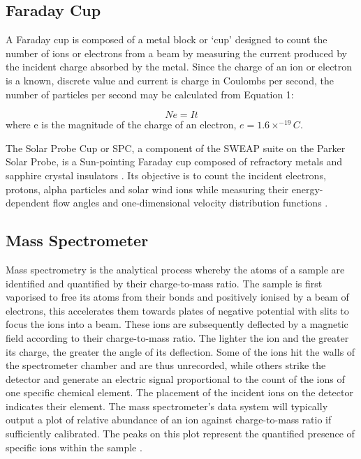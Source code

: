 \documentclass[12pt]{article}
\begin{document}
\vspace{\baselineskip}
\subsection{Faraday Cup}
\vspace{\baselineskip}

A Faraday cup is composed of a metal block or ‘cup’ designed to count the number of ions or electrons from a beam by measuring the current produced by the incident charge absorbed by the metal. Since the charge of an ion or electron is a known, discrete value and current is charge in Coulombs per second, the number of particles per second may be calculated from Equation 1:

\begin{equation} \label{particles}
    Ne = It
\end{equation}
\vspace{\baselineskip}
where e is the magnitude of the charge of an electron, $e = 1.6 × ^{−19} C$. 

The Solar Probe Cup or SPC, a component of the SWEAP suite on the Parker Solar Probe, is a Sun-pointing Faraday cup composed of refractory metals and sapphire crystal insulators \cite{faradaycup}. Its objective is to count the incident electrons, protons, alpha particles and solar wind ions while measuring their energy-dependent flow angles and one-dimensional velocity distribution functions \cite{pspcup}.

\vspace{\baselineskip}
\subsection{Mass Spectrometer}
\vspace{\baselineskip}

Mass spectrometry is the analytical process whereby the atoms of a sample are identified and quantified by their charge-to-mass ratio. The sample is first vaporised to free its atoms from their bonds and positively ionised by a beam of electrons, this accelerates them towards plates of negative potential with slits to focus the ions into a beam. These ions are subsequently deflected by a magnetic field according to their charge-to-mass ratio. The lighter the ion and the greater its charge, the greater the angle of its deflection. Some of the ions hit the walls of the spectrometer chamber and are thus unrecorded, while others strike the detector and generate an electric signal proportional to the count of the ions of one specific chemical element. The placement of the incident ions on the detector indicates their element. The mass spectrometer’s data system will typically output a plot of relative abundance of an ion against charge-to-mass ratio if sufficiently calibrated. The peaks on this plot represent the quantified presence of specific ions within the sample \cite{massspectrometer}.
\end{document}

